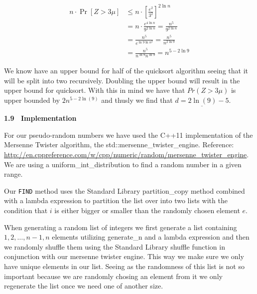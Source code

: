 \documentclass[article,a4paper,oneside]{article}
\newcommand{\+}[1]{\ensuremath{\boldsymbol{#1}}}
\begin{document}
\begin{align*}
n\cdot \Pr[Z>3\mu] &\leq n\cdot \left [ \frac{e^2}{3^2} \right ]^{2\ln n}\\
&=n\cdot\frac{e^{4\ln n}}{9^{2\ln n}} =\frac{n^5}{9^{2\ln n}}\\
&=\frac{n^5}{e^{\ln 9 \ln n^2}} =\frac{n^5}{n^{2\ln 9}}\\
&=\frac{n^5}{n^{\ln 9}n^{\ln 9}} =n^{5-2\ln 9}
\end{align*}

We know have an upper bound for half of the quicksort algorithm seeing that it will be split into two recursively. Doubling the upper bound will result in the upper bound for quicksort. With this in mind we have that $Pr(Z > 3\mu)$ is upper bounded by $2n^{5-2\ln(9)}$ and thusly we find that $\underline{d = 2\ln(9) - 5}$.


{\bf 1.9 \ Implementation}

For our pseudo-random numbers we have used the C++11 implementation of the Mersenne Twister algorithm, the std::mersenne\_twister\_engine. Reference: \url{ http://en.cppreference.com/w/cpp/numeric/random/mersenne_twister_engine}. We are using a uniform\_int\_distribution to find a random number in a given range. 

Our \texttt{FIND} method uses the Standard Library partition\_copy method combined with a lambda expression to partition the list over into two lists with the condition that $i$ is either bigger or smaller than the randomly chosen element $e$.

When generating a random list of integers we first generate a list containing $1,2,\ldots, n-1,n$ elements utilizing generate\_n and a lambda expression and then we randomly shuffle them using the Standard Library shuffle function in conjunction with our mersenne twister engine. This way we make sure we only have unique elements in our list. Seeing as the randomness of this list is not so important because we are randomly chosing an element from it we only regenerate the list once we need one of another size.

\end{document}
